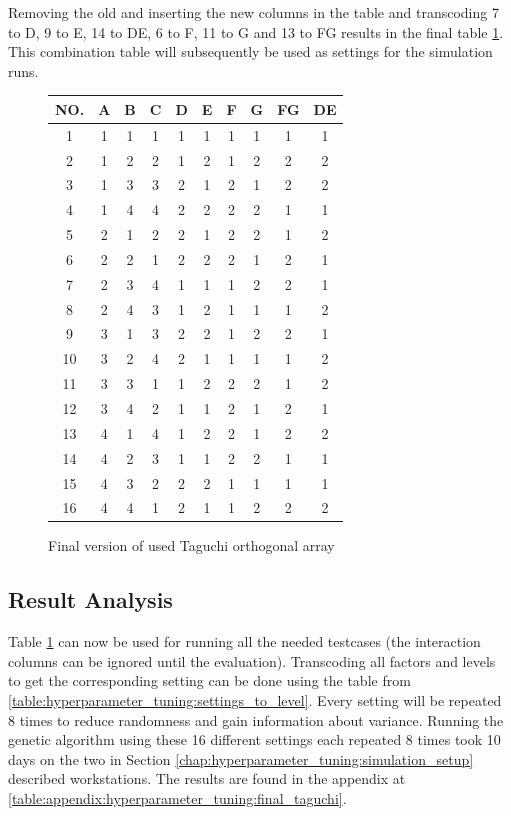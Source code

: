 Removing the old and inserting the new columns in the table and transcoding 7 to D, 9 to E, 14 to DE, 6 to F, 11 to G and 13 to FG results in the final table \ref{table:hyperparameter_tuning:final_taguchi}.
This combination table will subsequently be used as settings for the simulation runs.

\begin{figure}[ht]
	\centering
	\begin{tabular}{ |c||c|c|c|c|c|c|c|c|c|  }
		\hline
		NO.& A & B & C & D & E & F & G & FG& DE\\
		\hline
		1  & 1 & 1 & 1 & 1 & 1 & 1 & 1 & 1 & 1\\
		2  & 1 & 2 & 2 & 1 & 2 & 1 & 2 & 2 & 2\\
		3  & 1 & 3 & 3 & 2 & 1 & 2 & 1 & 2 & 2\\
		4  & 1 & 4 & 4 & 2 & 2 & 2 & 2 & 1 & 1\\
		5  & 2 & 1 & 2 & 2 & 1 & 2 & 2 & 1 & 2\\
		6  & 2 & 2 & 1 & 2 & 2 & 2 & 1 & 2 & 1\\
		7  & 2 & 3 & 4 & 1 & 1 & 1 & 2 & 2 & 1\\
		8  & 2 & 4 & 3 & 1 & 2 & 1 & 1 & 1 & 2\\
		9  & 3 & 1 & 3 & 2 & 2 & 1 & 2 & 2 & 1\\
		10 & 3 & 2 & 4 & 2 & 1 & 1 & 1 & 1 & 2\\
		11 & 3 & 3 & 1 & 1 & 2 & 2 & 2 & 1 & 2\\
		12 & 3 & 4 & 2 & 1 & 1 & 2 & 1 & 2 & 1\\
		13 & 4 & 1 & 4 & 1 & 2 & 2 & 1 & 2 & 2\\
		14 & 4 & 2 & 3 & 1 & 1 & 2 & 2 & 1 & 1\\
		15 & 4 & 3 & 2 & 2 & 2 & 1 & 1 & 1 & 1\\
		16 & 4 & 4 & 1 & 2 & 1 & 1 & 2 & 2 & 2\\
		\hline
	\end{tabular}
	\caption{Final version of used Taguchi orthogonal array}
	\label{table:hyperparameter_tuning:final_taguchi}
\end{figure}


\subsection{Result Analysis}
\label{chap:hyperparameter_tuning:analysis_of_results}
Table \ref{table:hyperparameter_tuning:final_taguchi} can now be used for running all the needed testcases (the interaction columns can be ignored until the evaluation). Transcoding all factors and levels to get the corresponding setting can be done using the table from \ref{table:hyperparameter_tuning:settings_to_level}. Every setting will be repeated 8 times to reduce randomness and gain information about variance. 
Running the genetic algorithm using these 16 different settings each repeated 8 times took 10 days on the two in Section \ref{chap:hyperparameter_tuning:simulation_setup} described workstations. The results are found in the appendix at \ref{table:appendix:hyperparameter_tuning:final_taguchi}.

